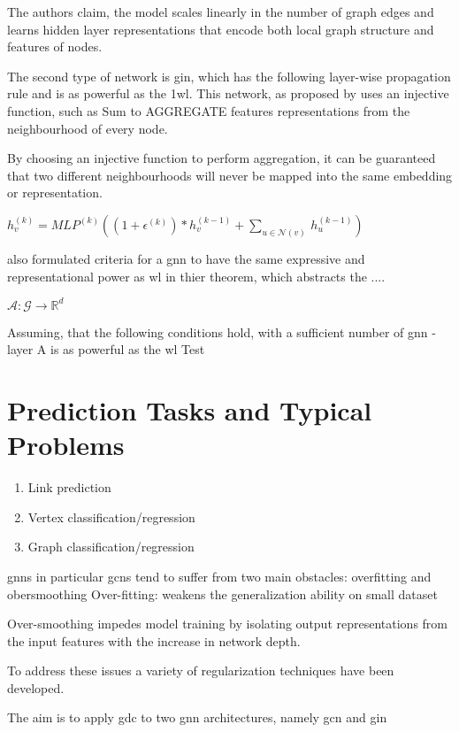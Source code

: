 The authors claim, the model scales linearly in the number of graph edges and learns hidden layer
representations that encode both local graph structure and features of nodes.


The second type of network is \ac{gin}, which has the following
layer-wise propagation rule and is as powerful as the \ac{1wl}. This network, as proposed by \cite{Xu2019}
uses an injective function, such as Sum to AGGREGATE features representations
from the neighbourhood of every node.

By choosing an injective function to perform aggregation, it can be
guaranteed that two different neighbourhoods will never be mapped into the same
embedding or representation.

$h^{(k)}_{v} = MLP^{(k)} ((1 + \epsilon^{(k)}) *h^{(k-1)}_{v} + \sum_{{u} \in{\mathcal{N}(v)}} \,h^{(k-1)}_{u})$

\cite{Xu2019} also formulated criteria for a \ac{gnn} to have
the same expressive and representational power as \ac{wl} in thier
theorem, which abstracts the ....


$\mathcal{A}: \mathcal{G} \rightarrow\mathbb{R}^{d}$

Assuming, that the following conditions hold, with a sufficient number
of \ac{gnn} - layer A is as powerful as the \ac{wl} Test


\section{Prediction Tasks and Typical Problems}


\begin{enumerate}
    \item Link prediction
    \item Vertex classification/regression
    \item Graph classification/regression
\end{enumerate}



\acp{gnn} in particular \acp{gcn} tend to suffer from two main obstacles:
overfitting and obersmoothing
Over-fitting: weakens the generalization ability on small dataset

Over-smoothing impedes model training by isolating output representations from the input features with the increase in network depth.

To address these issues a variety of regularization techniques have been developed.


The aim is to apply \ac{gdc} to two \ac{gnn} architectures, namely \ac{gcn} and
\ac{gin}


